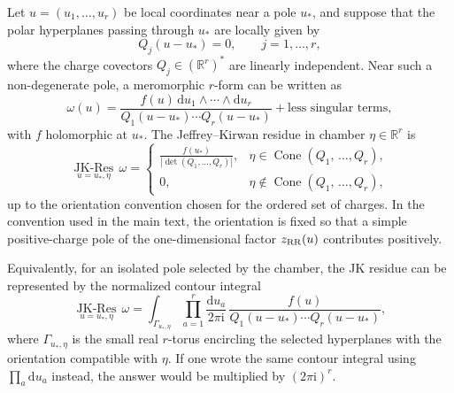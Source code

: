 \documentclass[11pt,a4paper]{article}
\numberwithin{equation}{section}
\theoremstyle{plain}
\theoremstyle{definition}
\theoremstyle{remark}
\newcommand{\ii}{\mathrm{i}}
\newcommand{\dd}{\mathrm{d}}
\begin{document}
Let \(u=(u_1,\ldots,u_r)\) be local coordinates near a pole \(u_*\), and suppose that the polar hyperplanes passing through \(u_*\) are locally given by
\begin{equation}
Q_j(u-u_*)=0,\qquad j=1,\ldots,r,
\label{eq:JK-local-hyperplanes}
\end{equation}
where the charge covectors \(Q_j\in(\mathbb R^r)^*\) are linearly independent.  Near such a non-degenerate pole, a meromorphic \(r\)-form can be written as
\begin{equation}
\omega(u)
=
\frac{f(u)\,\dd u_1\wedge\cdots\wedge\dd u_r}
{Q_1(u-u_*)\cdots Q_r(u-u_*)}+\text{less singular terms},
\label{eq:JK-local-form}
\end{equation}
with \(f\) holomorphic at \(u_*\).  The Jeffrey--Kirwan residue in chamber \(\eta\in\mathbb R^r\) is
\begin{equation}
\operatorname*{JK\mbox{-}Res}_{u=u_*,\eta}\,\omega
=
\begin{cases}
\displaystyle
\frac{f(u_*)}{\left|\det(Q_1,\ldots,Q_r)\right|},
& \eta\in\operatorname{Cone}(Q_1,\,\ldots,Q_r),\\[3mm]
0,& \eta\notin\operatorname{Cone}(Q_1,\,\ldots,Q_r),
\end{cases}
\label{eq:JK-local-definition}
\end{equation}
up to the orientation convention chosen for the ordered set of charges.  In the convention used in the main text, the orientation is fixed so that a simple positive-charge pole of the one-dimensional factor \(z_{\rm RR}(u)\) contributes positively.

Equivalently, for an isolated pole selected by the chamber, the JK residue can be represented by the normalized contour integral
\begin{equation}
\operatorname*{JK\mbox{-}Res}_{u=u_*,\eta}\,\omega
=
\int_{\Gamma_{u_*,\eta}}
\prod_{a=1}^{r}\frac{\dd u_a}{2\pi\ii}\,
\frac{f(u)}{Q_1(u-u_*)\cdots Q_r(u-u_*)},
\label{eq:JK-contour-definition}
\end{equation}
where \(\Gamma_{u_*,\eta}\) is the small real \(r\)-torus encircling the selected hyperplanes with the orientation compatible with \(\eta\).  If one wrote the same contour integral using \(\prod_a\dd u_a\) instead, the answer would be multiplied by \((2\pi\ii)^r\).
\end{document}
